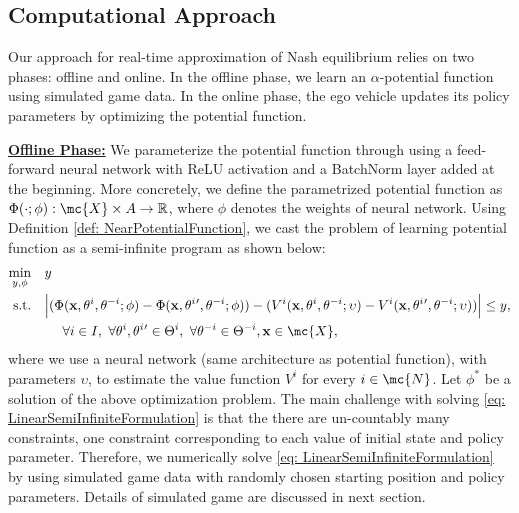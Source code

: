 \vspace{-7mm}
\subsection{Computational Approach}
\vspace{-1mm}
Our approach for real-time approximation of Nash equilibrium relies on two phases: offline and online. In the offline phase, we learn an \(\alpha\)-potential function using simulated game data. In the online phase, the ego vehicle updates its policy parameters by optimizing the potential function. 

 \vspace{1mm}
 \noindent \underline{\textbf{Offline Phase:}} 
    We parameterize the potential function through using a feed-forward neural network with ReLU activation and a BatchNorm layer added at the beginning. More concretely, we define the parametrized potential function as \(\Phi(\cdot;\phi): \mc{X} \times A \rightarrow \mathbb{R}\), where \(\phi\) denotes the weights of neural network. Using Definition \ref{def: NearPotentialFunction}, we cast the problem of learning potential function as a semi-infinite program as shown below: 
\begin{align} 
    \min_{\substack{ y, \phi}}\quad  &  y\label{eq: LinearSemiInfiniteFormulation}\\ 
    \text{s.t.}\quad &  \Big| (\Phi(\mathbf{x}, \theta^i,\theta^{-i}; \phi) -\Phi(\mathbf{x},\theta^i{}',\theta^{-i}; \phi)) - (V^i(\mathbf{x},\theta^i,\theta^{-i};\upsilon) -V^i(\mathbf{x},\theta^i{}',\theta^{-i};\upsilon)) \Big| \leq y, \notag \\  &\quad ~\forall i \in I, ~ \forall \theta^i, \theta^i{}' \in \Theta^i, ~ \forall \theta^{-i}\in \Theta^{-i}, \mathbf{x}\in\mc{X}, \notag 
\end{align}
where we use a neural network (same architecture as potential function), with parameters \(\upsilon\), to estimate the value function \(V^i\) for every \(i\in \mc{N}\). Let \(\phi^\ast\) be a solution of the above optimization problem. 
The main challenge with solving \eqref{eq: LinearSemiInfiniteFormulation} is that the there are un-countably many constraints, one constraint corresponding to each value of initial state and policy parameter. Therefore, we numerically solve \eqref{eq: LinearSemiInfiniteFormulation} by using  simulated game data with randomly chosen starting position and policy parameters. Details of simulated game are discussed in next section.  

